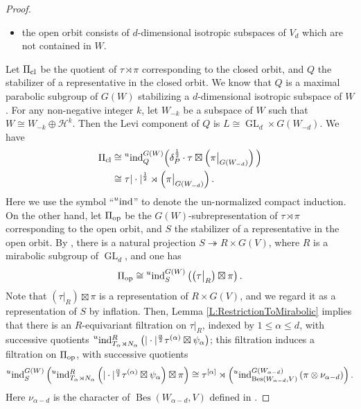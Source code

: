 \documentclass[11pt,letterpaper]{amsart}
\theoremstyle{plain}
\numberwithin{theorem}{section}
\numberwithin{equation}{subsection}
\theoremstyle{remark}
\newcommand{\GL}{\operatorname{GL}}
\newcommand{\ind}{\operatorname{ind}}
\newcommand{\Bes}{\operatorname{Bes}} %
\def\calH{\mathcal{H}}
\begin{document}
\begin{proof}
\begin{itemize}
    \item the open orbit consists of $d$-dimensional isotropic subspaces of $V_d$ which are not contained in $W$.
\end{itemize}
\vskip 5pt
Let $\Pi_{\rm cl}$ be the quotient of $\tau\rtimes \pi$ corresponding to the closed orbit, and $Q$ the stabilizer of a representative in the closed orbit. We know that $Q$ is a maximal parabolic subgroup of $G\left(W\right)$ stabilizing a $d$-dimensional isotropic subspace of $W$. For any non-negative integer $k$, let $W_{-k}$ be a subspace of $W$ such that $W\cong W_{-k}\oplus\calH^k$. Then the Levi component of $Q$ is $L\cong\GL_d\times G\left(W_{-d}\right)$. We have
\begin{align*}
    \Pi_{\rm cl} &\cong \prescript{u}{}{\ind}_Q^{G(W)}\Big(\delta_P^{\frac{1}{2}}\cdot\tau\boxtimes\left(\pi\big|_{G(W_{-d})}\right)\Big)\\
    &\cong \tau|\cdot|^{\frac{1}{2}}\rtimes\left(\pi\big|_{G(W_{-d})}\right).
\end{align*}
Here we use the symbol ``$\prescript{u}{}{\ind}$'' to denote the un-normalized compact induction. On the other hand, let $\Pi_{\rm op}$ be the $G\left(W\right)$-subrepresentation of $\tau\rtimes \pi$ corresponding to the open orbit, and $S$ the stabilizer of a representative in the open orbit. By \cite[Lem. 15.2]{MR3202556}, there is a natural projection $S\twoheadrightarrow R\times G\left(V\right)$, where $R$ is a mirabolic subgroup of $\GL_d$, and one has
\[
    \Pi_{\rm op} \cong \prescript{u}{}{\ind}_S^{G\left(W\right)} \left(\left(\tau\big|_R\right)\boxtimes \pi\right).
\]
Note that $\left(\tau\big|_R\right)\boxtimes \pi$ is a representation of $R\times G\left(V\right)$, and we regard it as a representation of $S$ by inflation. Then, Lemma \ref{L:RestrictionToMirabolic} implies that there is an $R$-equivariant filtration on $\tau\big|_R$, indexed by $1\leq\alpha\leq d$, with successive quotients $\prescript{u}{}{\ind}_{T_\alpha\rtimes N_\alpha}^R\left(|\cdot|^{\frac{\alpha}{2}}\tau^{(\alpha)}\boxtimes\psi_\alpha\right)$; this filtration induces a filtration on $\Pi_{\rm op}$, with successive quotients
\[
    \prescript{u}{}{\ind}_S^{G\left(W\right)} \left(\prescript{u}{}{\ind}_{T_\alpha\rtimes N_\alpha}^R\left(|\cdot|^{\frac{\alpha}{2}}\tau^{(\alpha)}\boxtimes\psi_\alpha\right)\boxtimes \pi\right) \cong \tau^{[\alpha]} \rtimes \left(\prescript{u}{}{\ind}_{\Bes(W_{\alpha-d},V)}^{G(W_{\alpha-d})} \left(\pi\otimes \nu_{\alpha-d}\right)\right).
\]
Here $\nu_{\alpha-d}$ is the character of $\Bes\left(W_{\alpha-d},V\right)$ defined in \cite[Sect. 12]{MR3202556}.


\end{proof}
\end{document}
